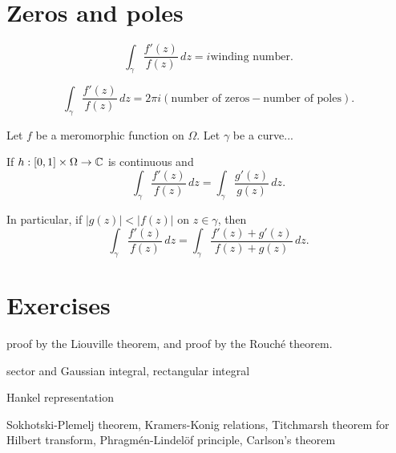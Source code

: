 \documentclass{../note}
\begin{document}
\section{Zeros and poles}
\begin{prb}
\begin{parts}
\item
\[\int_\gamma\frac{f'(z)}{f(z)}\,dz=i\text{winding number}.\]
\item
\[\int_\gamma\frac{f'(z)}{f(z)}\,dz=2\pi i(\text{number of zeros}-\text{number of poles}).\]
\end{parts}
\end{prb}

\begin{prb}
Let $f$ be a meromorphic function on $\Omega$.
Let $\gamma$ be a curve...
\begin{parts}
\item
If $h:[0,1]\times\Omega\to\mathbb{C}$ is continuous and 
\[\int_\gamma\frac{f'(z)}{f(z)}\,dz=\int_\gamma\frac{g'(z)}{g(z)}\,dz.\]
\item
In particular, if $|g(z)|<|f(z)|$ on $z\in\gamma$, then
\[\int_\gamma\frac{f'(z)}{f(z)}\,dz=\int_\gamma\frac{f'(z)+g'(z)}{f(z)+g(z)}\,dz.\]
\end{parts}
\end{prb}





\section*{Exercises}
\begin{prb}
 proof by the Liouville theorem, and proof by the Rouch\'e theorem.
\end{prb}

\begin{prb}
sector and Gaussian integral,
rectangular integral
\end{prb}
\begin{prb}
\end{prb}
\begin{prb}
Hankel representation
\end{prb}
\begin{prb}
\end{prb}

Sokhotski-Plemelj theorem,
Kramers-Konig relations,
Titchmarsh theorem for Hilbert transform,
Phragm\'en-Lindel\"of principle,
Carlson's theorem
\end{document}
